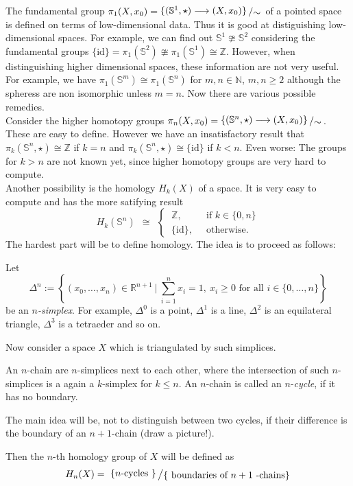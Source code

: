 \documentclass[11pt]{book}
\numberwithin{dummy}{section}
\theoremstyle{nonumberbreak}
\newcommand{\la}{\longrightarrow}
\newcommand{\id}{\mathrm{id}}
\newcommand{\slant}[2]{{\raisebox{.1em}{$#1$}\left/\raisebox{-.1em}{$#2$}\right.}}
\begin{document}
\begin{spacing}{1.4}
The fundamental group $\pi_1(X,x_0) = \slant{ \{ (\mathbb{S}^1, \star) \la (X,x_0) \}}{\sim}$ of a pointed space is defined on terms of low-dimensional data. Thus it is good at distiguishing low-dimensional spaces. For example, we can find out $\mathbb{S}^1 \ncong \mathbb{S}^2$ considering the fundamental groups $\{ \id\} = \pi_1(\mathbb{S}^2) \ncong \pi_1(\mathbb{S}^1) \cong \mathbb{Z}$. However, when distinguishing higher dimensional spaces, these information are not very useful. For example, we have $\pi_1(\mathbb{S}^m) \cong \pi_1(\mathbb{S}^n)$ for $m,n \in \mathbb{N}$, $m,n \geqslant 2$ although the spheress are non isomorphic unless $m=n$. Now there are various possible remedies.\\
Consider the higher homotopy groups $\pi_n(X,x_0) = \slant{\{ (\mathbb{S}^n, \star) \la (X,x_0)\}}{\sim}$. These are easy to define. However we have an insatisfactory result that $\pi_k(\mathbb{S}^n, \star) \cong \mathbb{Z}$ if $k=n$ and $\pi_k(\mathbb{S}^n, \star) \cong \{ \id\}$ if $k <n$. Even worse: The groups for $k>n$ are not known yet, since higher homotopy groups are very hard to compute.\\
Another possibility is the homology $H_k(X)$ of a space. It is very easy to compute and has the more satifying result 
$$H_k(\mathbb{S}^n)\ \  \cong \ \ \begin{cases} \ \mathbb{Z}, & \ \textrm{ if } k \in \{0,n\} \\
 \ \{ \id\}, & \ \textrm{ otherwise. }  \end{cases}$$
The hardest part will be to define homology. The idea is to proceed as follows:
\begin{compactenum}
\item Let 
$$\Delta^n := \left\{ (x_0, \ldots, x_n) \in \mathbb{R}^{n+1} \ \bigg\vert \ \sum_{i=1}^n x_i = 1, \ x_i \geqslant 0 \textrm{ for all } i \in \{0, \ldots, n \} \right\}$$
be an $n$\textit{-simplex}. For example, $\Delta^0$ is a point, $\Delta^1$ is a line, $\Delta^2$ is an equilateral triangle, $\Delta^3$ is a tetraeder and so on.
\item Now consider a space $X$ which is triangulated by such simplices. 
\item An $n$-chain are $n$-simplices next to each other, where the intersection of such $n$-simplices is a again a $k$-simplex for $k\leqslant n$.  An $n$-chain is called an $n$-\textit{cycle}, if it has no boundary.
\item The main idea will be, not to distinguish between two cycles, if their difference is the boundary of an $n+1$-chain (draw a picture!).
\item Then the $n$-th homology group of $X$ will be defined as
$$H_n(X) = \ \slant{\{n\textrm{-cycles }\}}{\{\textrm{ boundaries of }n+1 \textrm{-chains}\}}$$
\end{compactenum}






\end{spacing}
\end{document}
